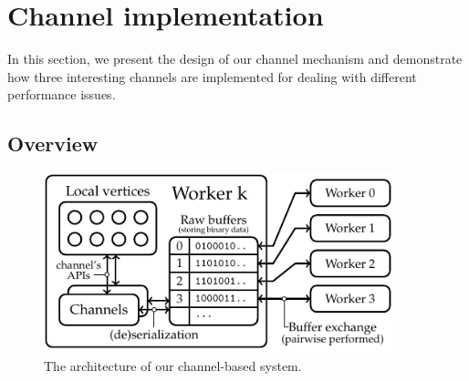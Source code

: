 \documentclass{sokendai_thesis} %
\begin{document}

\section{Channel implementation}

In this section, we present the design of our channel mechanism and demonstrate how three interesting channels are implemented for dealing with different performance issues.

\subsection{Overview}

\begin{figure}[t]
 \centering
 \includegraphics[width=0.9\textwidth]{figures/channel.pdf}
 \caption{The architecture of our channel-based system.}
 \label{fig:channels}
\end{figure}
\end{document}
